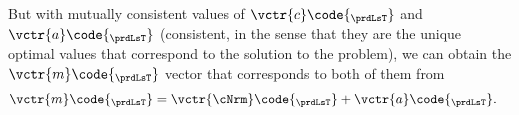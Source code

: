 \documentclass[\econtexRoot/SolvingMicroDSOPs]{subfiles}
\begin{document}

But with mutually consistent values of $\vctr{c}\code{_{\prdLsT}}$ and $\vctr{a}\code{_{\prdLsT}}$ (consistent, in the sense that they are the unique optimal values that correspond to the solution to the problem), we can obtain the $\vctr{m}\code{_{\prdLsT}}$ vector that corresponds to both of them from
\begin{equation}\begin{gathered}\begin{aligned}
      \vctr{m}\code{_{\prdLsT}}  & = {\vctr{\cNrm}\code{_{\prdLsT}}+\vctr{a}\code{_{\prdLsT}}}.
    \end{aligned}\end{gathered}\end{equation}
\end{document}
